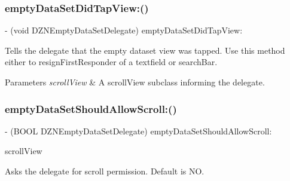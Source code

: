 \subsubsection{\texorpdfstring{empty\+Data\+Set\+Did\+Tap\+View\+:()}{emptyDataSetDidTapView:()}}
{\footnotesize\ttfamily -\/ (void D\+Z\+N\+Empty\+Data\+Set\+Delegate) empty\+Data\+Set\+Did\+Tap\+View\+: \begin{DoxyParamCaption}\item[{(-\/empty\+Data\+Set\+:did\+Tap\+View\+:\+D\+Z\+N\+Empty\+Data\+Set\+Deprecated)}]{ }\end{DoxyParamCaption}\hspace{0.3cm}{\ttfamily [optional]}}

Tells the delegate that the empty dataset view was tapped. Use this method either to resign\+First\+Responder of a textfield or search\+Bar.


\begin{DoxyParams}{Parameters}
{\em scroll\+View} & A scroll\+View subclass informing the delegate. \\
\hline
\end{DoxyParams}
\mbox{\label{protocol_d_z_n_empty_data_set_delegate_01-p_a9eac99fe443530ca18e504c7bdedb9be}} 
\subsubsection{\texorpdfstring{empty\+Data\+Set\+Should\+Allow\+Scroll\+:()}{emptyDataSetShouldAllowScroll:()}}
{\footnotesize\ttfamily -\/ (B\+O\+OL D\+Z\+N\+Empty\+Data\+Set\+Delegate) empty\+Data\+Set\+Should\+Allow\+Scroll\+: \begin{DoxyParamCaption}\item[{(U\+I\+Scroll\+View $\ast$)}]{scroll\+View }\end{DoxyParamCaption}\hspace{0.3cm}{\ttfamily [optional]}}

Asks the delegate for scroll permission. Default is NO.


